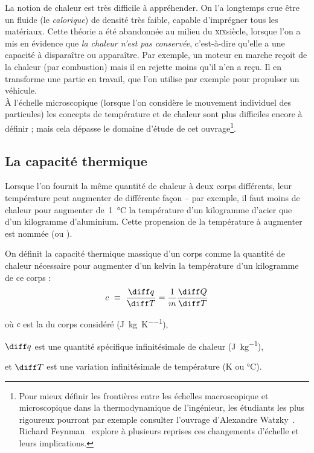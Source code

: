 		La notion de chaleur est très difficile à appréhender. On l’a longtemps crue être un fluide (le \textit{calorique}) de densité très faible, capable d’imprégner tous les matériaux. Cette théorie a été abandonnée au milieu du \textsc{xix}\ieme siècle, lorsque l’on a mis en évidence que \textit{la chaleur n’est pas conservée}, c’est-à-dire qu’elle a une capacité à disparaître ou apparaître. Par exemple, un moteur en marche reçoit de la chaleur (par combustion) mais il en rejette moins qu’il n’en a reçu. Il en transforme une partie en travail, que l’on utilise par exemple pour propulser un véhicule. \\
		À l’échelle microscopique (lorsque l’on considère le mouvement individuel des particules) les concepts de température et de chaleur sont plus difficiles encore à définir ; mais cela dépasse le domaine d’étude de cet ouvrage\footnote{Pour mieux définir les frontières entre les échelles macroscopique et microscopique dans la thermodynamique de l’ingénieur, les étudiants les plus rigoureux pourront par exemple consulter l’ouvrage d’Alexandre Watzky~\cite{watzky2007}. Richard Feynman~\cite{feynman1963, feynman1963fr} explore à plusieurs reprises ces changements d’échelle et leurs implications.}\nolinebreak.


	\subsection{La capacité thermique}
	\label{ch_capacite_thermique}

		Lorsque l’on fournit la même quantité de chaleur à deux corps différents, leur température peut augmenter de différente façon -- par exemple, il faut moins de chaleur pour augmenter de~\SI{1}{\degreeCelsius} la température d’un \si{kilogramme} d’acier que d’un \si{kilogramme} d’aluminium. Cette propension de la température à augmenter est nommée  (ou ).

		On définit la capacité thermique massique d’un corps comme la quantité de chaleur nécessaire pour augmenter d’un \si{kelvin} la température d’un \si{kilogramme} de ce corps :
		\begin{equation}
			c\ \equiv \ \frac{\diff q}{\diff T} = \frac{1}{m} \frac{\diff Q}{\diff T}
			\label{eq_def_capacité_calorifique_massique}
		\end{equation}
		\begin{equationterms}
			\item où \tab $c$			\tab\tab est la  du corps considéré (\si{\joule\per\kilogram\per\kelvin}),
			\item 	\tab $\diff q$ \tab est une quantité spécifique infinitésimale de chaleur (\si{\joule\per\kilogram}),
			\item et \tab $\diff T$ \tab est une variation infinitésimale de température (\si{\kelvin} ou \si{\degreeCelsius}).
		\end{equationterms}

